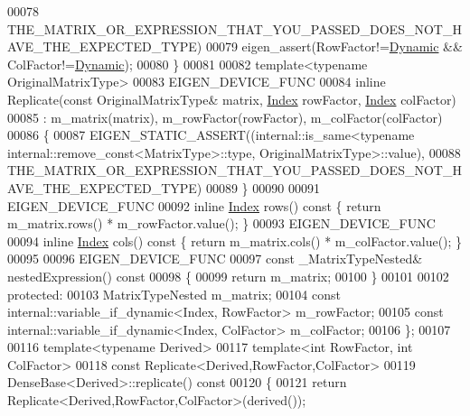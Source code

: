 \begin{DoxyCode}
00078                           THE\_MATRIX\_OR\_EXPRESSION\_THAT\_YOU\_PASSED\_DOES\_NOT\_HAVE\_THE\_EXPECTED\_TYPE)
00079       eigen\_assert(RowFactor!=\hyperlink{namespace_eigen_ad81fa7195215a0ce30017dfac309f0b2}{Dynamic} && ColFactor!=\hyperlink{namespace_eigen_ad81fa7195215a0ce30017dfac309f0b2}{Dynamic});
00080     \}
00081 
00082     \textcolor{keyword}{template}<\textcolor{keyword}{typename} OriginalMatrixType>
00083     EIGEN\_DEVICE\_FUNC
00084     \textcolor{keyword}{inline} Replicate(\textcolor{keyword}{const} OriginalMatrixType& matrix, \hyperlink{namespace_eigen_a62e77e0933482dafde8fe197d9a2cfde}{Index} rowFactor, 
      \hyperlink{namespace_eigen_a62e77e0933482dafde8fe197d9a2cfde}{Index} colFactor)
00085       : m\_matrix(matrix), m\_rowFactor(rowFactor), m\_colFactor(colFactor)
00086     \{
00087       EIGEN\_STATIC\_ASSERT((internal::is\_same<\textcolor{keyword}{typename} internal::remove\_const<MatrixType>::type,
      OriginalMatrixType>::value),
00088                           THE\_MATRIX\_OR\_EXPRESSION\_THAT\_YOU\_PASSED\_DOES\_NOT\_HAVE\_THE\_EXPECTED\_TYPE)
00089     \}
00090 
00091     EIGEN\_DEVICE\_FUNC
00092     \textcolor{keyword}{inline} \hyperlink{namespace_eigen_a62e77e0933482dafde8fe197d9a2cfde}{Index} rows()\textcolor{keyword}{ const }\{ \textcolor{keywordflow}{return} m\_matrix.rows() * m\_rowFactor.value(); \}
00093     EIGEN\_DEVICE\_FUNC
00094     \textcolor{keyword}{inline} \hyperlink{namespace_eigen_a62e77e0933482dafde8fe197d9a2cfde}{Index} cols()\textcolor{keyword}{ const }\{ \textcolor{keywordflow}{return} m\_matrix.cols() * m\_colFactor.value(); \}
00095 
00096     EIGEN\_DEVICE\_FUNC
00097     \textcolor{keyword}{const} \_MatrixTypeNested& nestedExpression()\textcolor{keyword}{ const}
00098 \textcolor{keyword}{    }\{ 
00099       \textcolor{keywordflow}{return} m\_matrix; 
00100     \}
00101 
00102   \textcolor{keyword}{protected}:
00103     MatrixTypeNested m\_matrix;
00104     \textcolor{keyword}{const} internal::variable\_if\_dynamic<Index, RowFactor> m\_rowFactor;
00105     \textcolor{keyword}{const} internal::variable\_if\_dynamic<Index, ColFactor> m\_colFactor;
00106 \};
00107 
00116 \textcolor{keyword}{template}<\textcolor{keyword}{typename} Derived>
00117 \textcolor{keyword}{template}<\textcolor{keywordtype}{int} RowFactor, \textcolor{keywordtype}{int} ColFactor>
00118 \textcolor{keyword}{const} Replicate<Derived,RowFactor,ColFactor>
00119 DenseBase<Derived>::replicate()\textcolor{keyword}{ const}
00120 \textcolor{keyword}{}\{
00121   \textcolor{keywordflow}{return} Replicate<Derived,RowFactor,ColFactor>(derived());

\end{DoxyCode}
